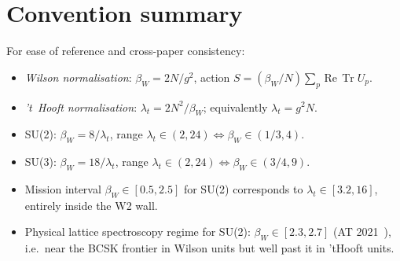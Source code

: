 \documentclass[11pt,a4paper]{article}
\theoremstyle{definition}
\theoremstyle{remark}
\DeclareMathOperator{\Tr}{Tr}
\newcommand{\sgnRe}{\,\mathrm{Re}\,}
\begin{document}
\section{Convention summary}\label{app:conv}

For ease of reference and cross-paper consistency:

\begin{itemize}
\item \emph{Wilson normalisation}: $\beta_W = 2N/g^2$, action
$S = (\beta_W/N) \sum_p \sgnRe \Tr U_p$.
\item \emph{'t~Hooft normalisation}: $\lambda_t = 2N^2/\beta_W$;
equivalently $\lambda_t = g^2 N$.
\item SU(2): $\beta_W = 8/\lambda_t$, range
$\lambda_t \in (2, 24) \Leftrightarrow \beta_W \in (1/3, 4)$.
\item SU(3): $\beta_W = 18/\lambda_t$, range
$\lambda_t \in (2, 24) \Leftrightarrow \beta_W \in (3/4, 9)$.
\item Mission interval $\beta_W \in [0.5, 2.5]$ for SU(2)
corresponds to $\lambda_t \in [3.2, 16]$, entirely inside the W2
wall.
\item Physical lattice spectroscopy regime for SU(2):
$\beta_W \in [2.3, 2.7]$ (AT 2021~\cite[\S5]{AthenodorouTeper2021}),
i.e.\ near the BCSK frontier in Wilson units but well past it in
'tHooft units.
\end{itemize}

\medskip
\end{document}
